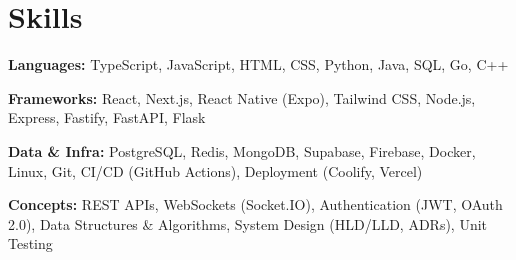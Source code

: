 \documentclass[10pt, a4paper]{article}
\begin{document}
\section{Skills}
\textbf{Languages:} TypeScript, JavaScript, HTML, CSS, Python, Java, SQL, Go, C++\par
\textbf{Frameworks:} React, Next.js, React Native (Expo), Tailwind CSS, Node.js, Express, Fastify, FastAPI, Flask\par
\textbf{Data \& Infra:} PostgreSQL, Redis, MongoDB, Supabase, Firebase, Docker, Linux, Git, CI/CD (GitHub Actions), Deployment (Coolify, Vercel)\par
\textbf{Concepts:} REST APIs, WebSockets (Socket.IO), Authentication (JWT, OAuth 2.0), Data Structures \& Algorithms, System Design (HLD/LLD, ADRs), Unit Testing
\end{document}
